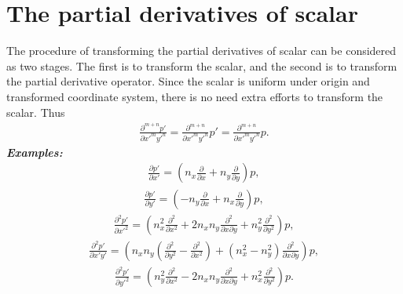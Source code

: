 \documentclass[review]{elsarticle}
\begin{document}
\section{The partial derivatives of scalar}
The procedure of transforming the partial derivatives of scalar can be considered as two stages. The first is to transform the scalar, and the second is to transform the partial derivative operator. Since the scalar is uniform under origin and transformed coordinate system, there is no need extra efforts to transform the scalar. Thus
\begin{equation}\label{dmndx'mdy'n:scalar}
	\begin{gathered}
		\frac{\partial^{m+n}p'}{\partial x'^my'^n} = \frac{\partial^{m+n}}{\partial x'^my'^n}p'
		=\frac{\partial^{m+n}}{\partial x'^my'^n}p.
	\end{gathered}
\end{equation}
\textit{\textbf{Examples:}}\\
\begin{equation}\label{dp'dx'}
	\begin{gathered}
		\frac{\partial{p'}}{\partial{x'}}
		=\left(n_x\frac{\partial}{\partial{x}} + n_y\frac{\partial}{\partial{y}}	\right)p,
	\end{gathered}
\end{equation}
\begin{equation}\label{dp'dy'}
	\begin{gathered}
		\frac{\partial{p'}}{\partial{y'}} 
		= \left(-n_y\frac{\partial}{\partial{x}} + n_x\frac{\partial}{\partial{y}} \right)p,
	\end{gathered}
\end{equation}
\begin{equation}\label{dp'2dx'2}
	\begin{gathered}
		\frac{\partial^2{p'}}{\partial{x'^2}} 
		= \left(n_x^2\frac{\partial^2}{\partial x^2}+2n_xn_y\frac{\partial^2}{\partial x\partial y}
		+n_y^2\frac{\partial^2}{\partial y^2} \right)p,
	\end{gathered}
\end{equation}
\begin{equation}\label{dp'2dx'dy'}
	\begin{gathered}
		\frac{\partial^2{p'}}{\partial{x'y'}} 
		= \left(n_xn_y\left(\frac{\partial^2}{\partial y^2}-\frac{\partial^2}{\partial x^2}\right)
		+\left(n_x^2-n_y^2\right)\frac{\partial^2}{\partial x\partial y} \right)p,
	\end{gathered}
\end{equation}
\begin{equation}\label{dp'2dy'2}
	\begin{gathered}
		\frac{\partial^2{p'}}{\partial{y'^2}} 
		= \left( n_y^2\frac{\partial^2}{\partial x^2}-2n_xn_y\frac{\partial^2}{\partial x\partial y}
		+n_x^2\frac{\partial^2}{\partial y^2}\right)p.
	\end{gathered}
\end{equation}
\end{document}
